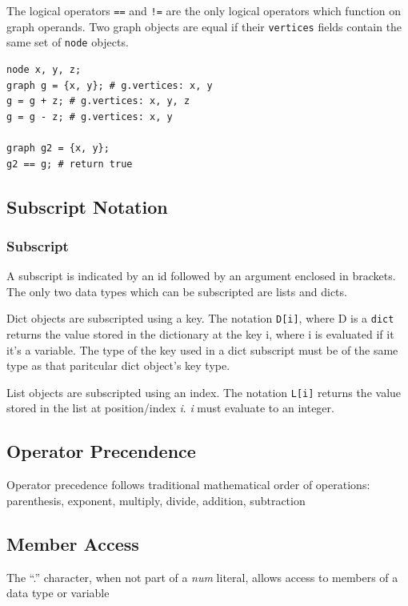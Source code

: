 \documentclass{article}
\newcommand{\code}[1]{\texttt{#1}} %
\begin{document}
The logical operators \code{==} and \code{!=} are the only logical operators which function on graph operands. Two graph objects are equal if their \code{vertices} fields contain the same set of \code{node} objects. 


\begin{lstlisting}[language=pltLang, caption=Shows the use of graph operators., label=lst:graph-ops]
node x, y, z;
graph g = {x, y}; # g.vertices: x, y
g = g + z; # g.vertices: x, y, z
g = g - z; # g.vertices: x, y

graph g2 = {x, y};
g2 == g; # return true
\end{lstlisting}

\subsection{Subscript Notation}

\subsubsection{Subscript}

A subscript is indicated by an id followed by an argument enclosed in brackets. The only two data types which can be subscripted are lists and dicts.

Dict objects are subscripted using a key. The notation \code{D[i]}, where D is a \code{dict} returns the value stored in the dictionary at the key i, where i is evaluated if it it's a variable. The type of the key used in a dict subscript must be of the same type as that paritcular dict object's key type.

List objects are subscripted using an index. The notation \code{L[i]} returns the value stored in the list at position/index \emph{i}. \emph{i} must evaluate to an integer. 


\subsection{Operator Precendence}

Operator precedence follows traditional mathematical order of operations: parenthesis, exponent, multiply, divide, addition, subtraction

\subsection{Member Access}
 The ``.'' character, when not part of a \emph{num} literal, allows access to members of a data type or variable
\end{document}
